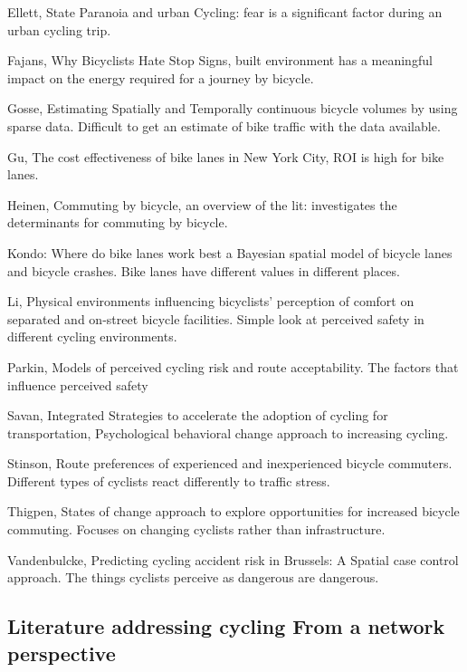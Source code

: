 \documentclass[11pt]{article} %
\begin{document}
Ellett, State Paranoia and urban Cycling: fear is a significant factor during an urban cycling trip. \cite{ellett2018state}

Fajans, Why Bicyclists Hate Stop Signs, built environment has a meaningful impact on the energy required for a journey by bicycle. \cite{fajans2001bicyclists}

Gosse, Estimating Spatially and Temporally continuous bicycle volumes by using sparse data. Difficult to get an estimate of bike traffic with the data available. \cite{gosse2014estimating}

Gu, The cost effectiveness of bike lanes in New York City, ROI is high for bike lanes. \cite{gu2017cost}

Heinen, Commuting by bicycle, an overview of the lit: investigates the determinants for commuting by bicycle. \cite{heinen2010commuting}

Kondo: Where do bike lanes work best a Bayesian spatial model of bicycle lanes and bicycle crashes. Bike lanes have different values in different places. \cite{kondo2018bike}

Li, Physical environments influencing bicyclists' perception of comfort on separated and on-street bicycle facilities. Simple look at perceived safety in different cycling environments. \cite{li2012physical}

Parkin, Models of perceived cycling risk and route acceptability. The factors that influence perceived safety \cite{parkin2007models}

Savan, Integrated Strategies to accelerate the adoption of cycling for transportation, Psychological behavioral change approach to increasing cycling. \cite{savan2017integrated}

Stinson, Route preferences of experienced and inexperienced bicycle commuters. Different types of cyclists react differently to traffic stress. \cite{stinson2005comparison}

Thigpen, States of change approach to explore opportunities for increased bicycle commuting. Focuses on changing cyclists rather than infrastructure. \cite{thigpen2015using}

Vandenbulcke, Predicting cycling accident risk in Brussels: A Spatial case control approach. The things cyclists perceive as dangerous are dangerous. \cite{vandenbulcke2014predicting}


\subsection{Literature addressing cycling From a network perspective}
\end{document}

